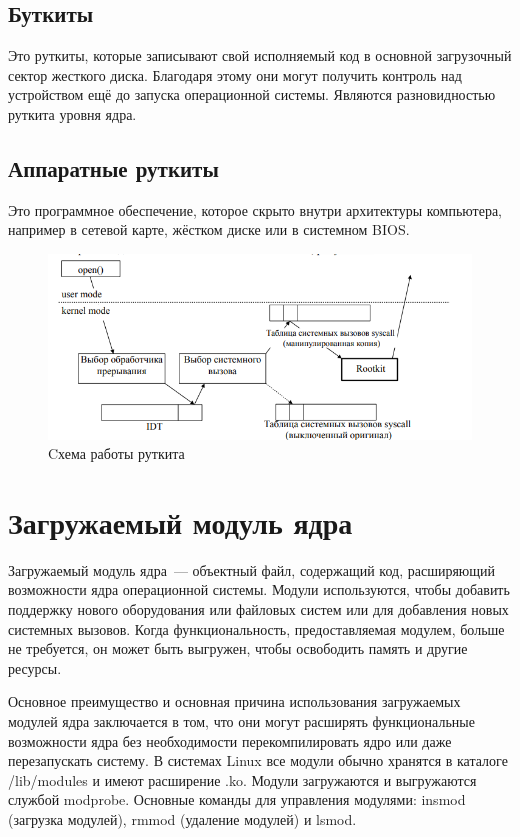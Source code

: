 \subsection{Буткиты} Это руткиты, которые записывают свой исполняемый код в основной загрузочный сектор жесткого диска. Благодаря этому они могут получить контроль над устройством ещё до запуска операционной системы. Являются разновидностью руткита уровня ядра.

\subsection{Аппаратные руткиты} Это программное обеспечение, которое скрыто внутри архитектуры компьютера, например в сетевой карте, жёстком диске или в системном BIOS.

\begin{figure}[H]
    \centering
    \includegraphics[scale=0.65]{img/rootkit.jpg}
    \caption{Cхема работы руткита}\label{img:rootkit}
\end{figure}

\section{Загружаемый модуль ядра}%
\label{sec:zagruzhaemyi_modul_iadra}

Загружаемый модуль ядра~--- объектный файл, содержащий код, расширяющий возможности ядра операционной системы. Модули используются, чтобы добавить поддержку нового оборудования или файловых систем или для добавления новых системных вызовов. Когда функциональность, предоставляемая модулем, больше не требуется, он может быть выгружен, чтобы освободить память и другие ресурсы.

Основное преимущество и основная причина использования загружаемых модулей ядра заключается в том, что они могут расширять функциональные возможности ядра без необходимости перекомпилировать ядро или даже перезапускать систему. В системах Linux все модули обычно хранятся в каталоге /lib/modules и имеют расширение .ko. Модули загружаются и выгружаются службой modprobe. Основные команды для управления модулями: insmod (загрузка модулей), rmmod (удаление модулей) и lsmod.

